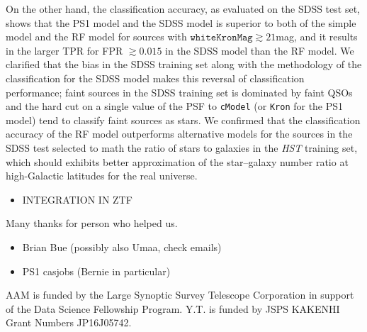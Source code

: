 \documentclass[twocolumn, dvipdfmx]{aastex62}
\begin{document}
{On the other hand, the classification accuracy, as evaluated on the SDSS test set, 
shows that the PS1 model and the SDSS model is superior to both of the simple model and the RF model 
for sources with $\mathtt{whiteKronMag}\gtrsim21$mag, 
and it results in the larger TPR for FPR $\gtrsim 0.015$ in the SDSS model than the RF model. 
We clarified that the bias in the SDSS training set along with the methodology of the classification 
for the SDSS model makes this reversal of classification performance; 
faint sources in the SDSS training set is dominated by faint QSOs and the hard cut on a single value 
of the PSF to \texttt{cModel} (or \texttt{Kron} for the PS1 model) tend to classify faint sources as stars. 
We confirmed that the classification accuracy of the RF model outperforms alternative models 
for the sources in the SDSS test selected to math the ratio of stars to galaxies in the {\it HST} training set, 
which should exhibits better approximation of the star--galaxy number ratio at high-Galactic latitudes 
for the real universe. 

\begin{itemize}
  \item{INTEGRATION IN ZTF}
\end{itemize}
}



\acknowledgements
Many thanks for person who helped us. 

\begin{itemize}
    \item Brian Bue (possibly also Umaa, check emails)
    \item PS1 casjobs (Bernie in particular)
\end{itemize}

AAM is funded by the Large Synoptic Survey Telescope Corporation in support of
the Data Science Fellowship Program. 
Y.T. is funded by JSPS KAKENHI Grant Numbers JP16J05742. 








\end{document}
